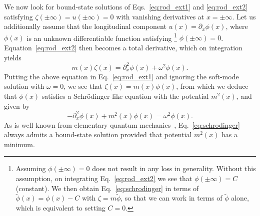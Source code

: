 We now look for bound-state solutions of Eqs.~\eqref{eq:rod_ext1} and \eqref{eq:rod_ext2} satisfying $\zeta(\pm\infty) = u(\pm\infty) = 0$ with vanishing derivatives at $x = \pm\infty$.
Let us additionally assume that the longitudinal component $u(x) = \partial_{x}\phi(x)$, where $\phi(x)$ is an unknown differentiable function satisfying%
\footnote{Assuming $\phi(\pm\infty) = 0$ does not result in any loss in generality.
Without this assumption, on integrating Eq.~\eqref{eq:rod_ext2} we see that $\phi(\pm\infty) = C$ (constant).
We then obtain Eq.~\eqref{eq:schrodinger} in terms of $\widetilde{\phi}(x) = \phi(x) - C$ with $\zeta = m\widetilde{\phi}$, so that we can work in terms of $\widetilde{\phi}$ alone, which is equivalent to setting $C = 0$.}
$\phi(\pm\infty) = 0$.
Equation~\eqref{eq:rod_ext2} then becomes a total derivative, which on integration yields
%
\begin{equation}
  m(x)\zeta(x) = \partial_{x}^{2}\phi(x) + \omega^{2}\phi(x).
\end{equation}
%
Putting the above equation in Eq.~\eqref{eq:rod_ext1} and ignoring the soft-mode solution with $\omega = 0$, we see that $\zeta(x) = m(x)\phi(x)$, from which we deduce that $\phi(x)$ satisfies a Schr\"{o}dinger-like equation with the potential $m^{2}(x)$, and given by
%
\begin{equation}
  -\partial_{x}^{2}\phi(x) + m^{2}(x)\phi(x) = \omega^{2}\phi(x).
  \label{eq:schrodinger}
\end{equation}
%
As is well known from elementary quantum mechanics~\cite{buell1995}, Eq.~\eqref{eq:schrodinger} always admits a bound-state solution provided that potential $m^{2}(x)$ has a minimum.

